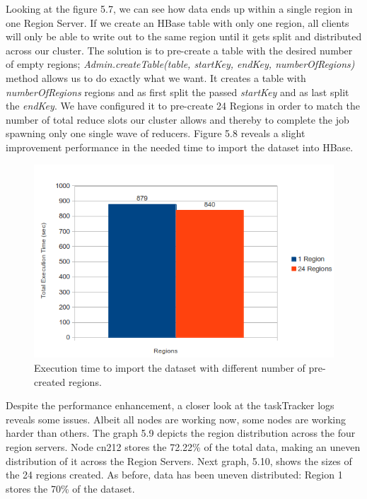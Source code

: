 Looking at the figure 5.7, we can see how data ends up within a single region in one Region Server. If we create an HBase table with only one region, all clients will only be able to write out to the same region until it gets split and distributed across our cluster. The solution is to pre-create a table with the desired number of empty regions; \textit{Admin.createTable(table, startKey, endKey, numberOfRegions)} method allows us to do exactly what we want. It creates a table with \textit{numberOfRegions} regions and as first split the passed \textit{startKey} and as last split the \textit{endKey}. We have configured it to pre-create 24 Regions in order to match the number of total reduce slots our cluster allows and thereby to complete the job spawning only one single wave of reducers. Figure 5.8 reveals a slight improvement performance in the needed time to import the dataset into HBase.


\begin{figure}[htb]
\centering
\includegraphics[width=1\textwidth]{./images/1-24regions1.png}
\caption{Execution time to import the dataset with different number of pre-created regions.} \label{fig:regions}
\end{figure}

Despite the performance enhancement, a closer look at the taskTracker logs reveals some issues. Albeit all nodes are working now, some nodes are working harder than others. The graph 5.9 depicts the region distribution across the four region servers. Node cn212 stores the 72.22\% of the total data, making an uneven distribution of it across the Region Servers. Next graph, 5.10, shows the sizes of the 24 regions created. As before, data has been uneven distributed: Region 1 stores the 70\% of the dataset.




